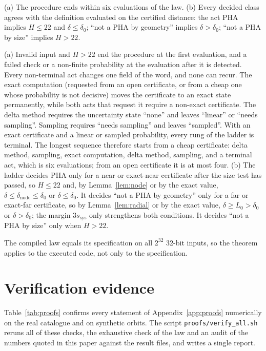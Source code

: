 \begin{theorem}\label{thm:law}
(a) The procedure ends within six evaluations of the law. (b) Every decided class agrees with the definition evaluated on the certified distance: the act PHA implies $H \le 22$ and $\delta \le \delta_0$; ``not a PHA by geometry'' implies $\delta > \delta_0$; ``not a PHA by size'' implies $H > 22$.
\end{theorem}
\begin{IEEEproof}
(a) Invalid input and $H > 22$ end the procedure at the first evaluation, and a failed check or a non-finite probability at the evaluation after it is detected. Every non-terminal act changes one field of the word, and none can recur. The exact computation (requested from an open certificate, or from a cheap one whose probability is not decisive) moves the certificate to an exact state permanently, while both acts that request it require a non-exact certificate. The delta method requires the uncertainty state ``none'' and leaves ``linear'' or ``needs sampling''. Sampling requires ``needs sampling'' and leaves ``sampled''. With an exact certificate and a linear or sampled probability, every rung of the ladder is terminal. The longest sequence therefore starts from a cheap certificate: delta method, sampling, exact computation, delta method, sampling, and a terminal act, which is six evaluations; from an open certificate it is at most four.
(b) The ladder decides PHA only for a near or exact-near certificate after the size test has passed, so $H \le 22$ and, by Lemma~\ref{lem:node} or by the exact value, $\delta \le \delta_{\mathrm{node}} \le \delta_0$ or $\delta \le \delta_0$. It decides ``not a PHA by geometry'' only for a far or exact-far certificate, so by Lemma~\ref{lem:radial} or by the exact value, $\delta \ge L_0 > \delta_0$ or $\delta > \delta_0$; the margin $3s_{\mathrm{sys}}$ only strengthens both conditions. It decides ``not a PHA by size'' only when $H > 22$.
\end{IEEEproof}
The compiled law equals its specification on all $2^{32}$ 32-bit inputs, so the theorem applies to the executed code, not only to the specification.

\section{Verification evidence}
\label{app:verify}
Table~\ref{tab:proofs} confirms every statement of Appendix~\ref{app:proofs} numerically on the real catalogue and on synthetic orbits. The script \texttt{proofs/verify\_all.sh} reruns all of these checks, the exhaustive check of the law and an audit of the numbers quoted in this paper against the result files, and writes a single report.


